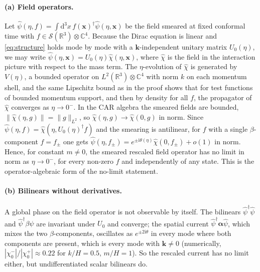 \documentclass[11pt,a4paper]{article}
\theoremstyle{definition}
\newcommand{\dd}{\mathrm{d}}
\newcommand{\ii}{\mathrm{i}}
\newcommand{\hpsi}{\hat\psi}
\begin{document}
\paragraph{(a) Field operators.}
Let $\hpsi(\eta,f)=\int\dd^{3}x\,f(\mathbf{x})^{\dagger}\hpsi(\eta,\mathbf{x})$ be the field smeared at fixed conformal time with $f\in\mathcal{S}(\mathbb{R}^{3})\otimes\mathbb{C}^{4}$. Because the Dirac equation is linear and \eqref{eq:structure} holds mode by mode with a $\mathbf{k}$-independent unitary matrix $U_{0}(\eta)$, we may write $\hpsi(\eta,\mathbf{x})=U_{0}(\eta)\hat\chi(\eta,\mathbf{x})$, where $\hat\chi$ is the field in the interaction picture with respect to the mass term. The $\eta$-evolution of $\hat\chi$ is generated by $V(\eta)$, a bounded operator on $L^{2}(\mathbb{R}^{3})\otimes\mathbb{C}^{4}$ with norm $k$ on each momentum shell, and the same Lipschitz bound as in the proof shows that for test functions of bounded momentum support, and then by density for all $f$, the propagator of $\hat\chi$ converges as $\eta\to0^{-}$. In the CAR algebra the smeared fields are bounded, $\|\hat\chi(\eta,g)\|=\|g\|_{L^{2}}$, so $\hat\chi(\eta,g)\to\hat\chi(0,g)$ in norm. Since $\hpsi(\eta,f)=\hat\chi(\eta,U_{0}(\eta)^{\dagger}f)$ and the smearing is antilinear, for $f$ with a single $\beta$-component $f=f_{\pm}$ one gets $\hpsi(\eta,f_{\pm})=e^{\pm\ii\theta(\eta)}\hat\chi(0,f_{\pm})+o(1)$ in norm. Hence, for constant $m\neq0$, the smeared rescaled field operator has no limit in norm as $\eta\to0^{-}$, for every non-zero $f$ and independently of any state. This is the operator-algebraic form of the no-limit statement.

\paragraph{(b) Bilinears without derivatives.}
A global phase on the field operator is not observable by itself. The bilinears $\hpsi^{\dagger}\hpsi$ and $\hpsi^{\dagger}\beta\hpsi$ are invariant under $U_{0}$ and converge; the spatial current $\hpsi^{\dagger}\boldsymbol\alpha\hpsi$, which mixes the two $\beta$-components, oscillates as $e^{\pm2\ii\theta}$ in every mode where both components are present, which is every mode with $\mathbf{k}\ne0$ (numerically, $|\chi_{0}^{-}|/|\chi_{0}^{+}|\approx0.22$ for $k/H=0.5$, $m/H=1$). So the rescaled current has no limit either, but undifferentiated scalar bilinears do.
\end{document}
